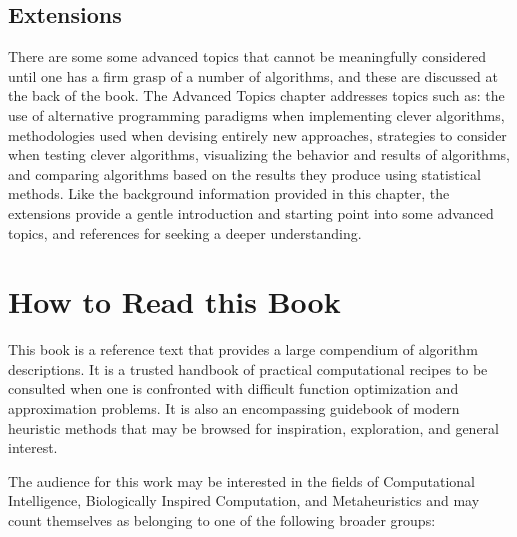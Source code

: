 \begin{bibunit}
% 
%
\subsection{Extensions}
There are some some advanced topics that cannot be meaningfully considered until one has a firm grasp of a number of algorithms, and these are discussed at the back of the book. 
The Advanced Topics chapter addresses topics such as: the use of alternative programming paradigms when implementing clever algorithms, methodologies used when devising entirely new approaches, strategies to consider when testing clever algorithms, visualizing the behavior and results of algorithms, and comparing algorithms based on the results they produce using statistical methods.
Like the background information provided in this chapter, the extensions provide a gentle introduction and starting point into some advanced topics, and references for seeking a deeper understanding. 


% 
% 
\section{How to Read this Book}
\label{intro:sec:how_to_read}
This book is a reference text that provides a large compendium of algorithm descriptions. 
It is a trusted handbook of practical computational recipes to be consulted when one is confronted with difficult function optimization and approximation problems. It is also an encompassing guidebook of modern heuristic methods that may be browsed for inspiration, exploration, and general interest.

The audience for this work may be interested in the fields of Computational Intelligence, Biologically Inspired Computation, and Metaheuristics and may count themselves as belonging to one of the following broader groups:


\end{bibunit}
